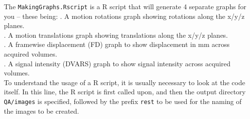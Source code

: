  The \texttt{MakingGraphs.Rscript} is a R script that will generate 4 separate graphs for you -- these being: 
	. A motion rotations graph showing rotations along the x/y/z planes.\\
	. A motion translations graph showing translations along the x/y/z planes.\\
	. A framewise displacement (FD) graph to show displacement in mm across acquired volumes.\\
	. A signal intensity (DVARS) graph to show signal intensity across acquired volumes.\\
	To understand the usage of a R script, it is usually necessary to look at the code itself. In this line, the R script is first called upon, and then the output directory \texttt{QA/images} is specified, followed by the prefix \texttt{rest} to be used for the naming of the images to be created.\\

